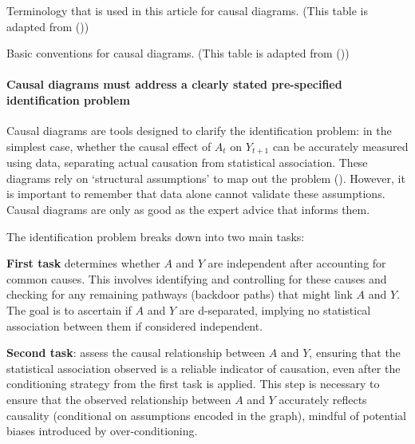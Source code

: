 \documentclass[
  singlecolumn]{article}
\let\oldparagraph\paragraph
\renewcommand{\paragraph}[1]{\oldparagraph{#1}\mbox{}}
\begin{document}
\begin{table}

\caption{\label{tbl-01}Terminology that is used in this article for
causal diagrams. (This table is adapted from
())}

\centering{

\terminologylocalconventions

}

\end{table}%

\begin{table}

\caption{\label{tbl-02}Basic conventions for causal diagrams. (This
table is adapted from ())}

\centering{

\terminologygeneral

}

\end{table}%

\paragraph{Causal diagrams must address a clearly stated pre-specified
identification
problem}\label{causal-diagrams-must-address-a-clearly-stated-pre-specified-identification-problem}

Causal diagrams are tools designed to clarify the identification
problem: in the simplest case, whether the causal effect of \(A_t\) on
\(Y_{t + 1}\) can be accurately measured using data, separating actual
causation from statistical association. These diagrams rely on
`structural assumptions' to map out the problem
(). However, it
is important to remember that data alone cannot validate these
assumptions. Causal diagrams are only as good as the expert advice that
informs them.

The identification problem breaks down into two main tasks:

\textbf{First task} determines whether \(A\) and \(Y\) are independent
after accounting for common causes. This involves identifying and
controlling for these causes and checking for any remaining pathways
(backdoor paths) that might link \(A\) and \(Y\). The goal is to
ascertain if \(A\) and \(Y\) are d-separated, implying no statistical
association between them if considered independent.

\textbf{Second task}: assess the causal relationship between \(A\) and
\(Y\), ensuring that the statistical association observed is a reliable
indicator of causation, even after the conditioning strategy from the
first task is applied. This step is necessary to ensure that the
observed relationship between \(A\) and \(Y\) accurately reflects
causality (conditional on assumptions encoded in the graph), mindful of
potential biases introduced by over-conditioning.
\end{document}

